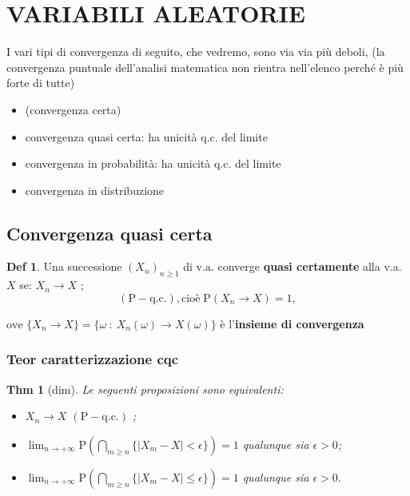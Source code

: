 \documentclass[a4paper,11pt]{article}
\theoremstyle{plain}
\newtheorem{thm}{Thm}[section]
\theoremstyle{definition}
\newtheorem{defn}{Def}[section]
\theoremstyle{remark}
\begin{document}
\newpage

\section {VARIABILI ALEATORIE}

I  vari tipi di convergenza di seguito, che vedremo, sono via via più deboli, (la convergenza puntuale dell'analisi matematica non rientra nell'elenco perché è più forte di tutte)
\begin{itemize}
    \item [1] (convergenza certa)
    \item [2] convergenza quasi certa: ha unicità q.c. del limite
    \item [3] convergenza in probabilità: ha unicità q.c. del limite 
    \item [4] convergenza in distribuzione
\end{itemize}
\subsection{Convergenza quasi certa}
\begin{defn}  
Una successione $(X_{n})_{n\geq 1}$ di $\mathrm{v}.\mathrm{a}$. converge \textbf{quasi certamente} alla v.a. $X$ se: $X_{n}\rightarrow X$ ;
$$\mathrm{ (P-q.c.) },  \mathrm{cioè } \;
\mathrm{P}(X_{n} \rightarrow X)=1,$$

\noindent
$\mathrm{o}\mathrm{v}\mathrm{e}$  $\{X_{n}\rightarrow X\}=\{\omega\ :\ X_{n}(\omega)\rightarrow X(\omega)\}$ è l'\textbf{insieme di convergenza}
\end{defn}

\subsubsection{Teor caratterizzazione cqc}
\begin{thm}[dim] Le seguenti proposizioni sono equivalenti:
\begin{itemize}
\item [i)]$X_{n}\rightarrow X$ $ (\mathrm{P}- \mathrm{q}.\mathrm{c}.)$ ;
\item [ii)] $\displaystyle \lim_{n\rightarrow+\infty}\mathrm{P}(\bigcap_{m\geq n}\{|X_{m}-X|<\epsilon\})=1$ qualunque sia $\epsilon>0$; 
\item [iii)] $\displaystyle \lim_{n\rightarrow+\infty}\mathrm{P}(\bigcap_{m\geq n}\{|X_{m}-X|\leq\epsilon\})=1$ qualunque sia $\epsilon>0.$
\end{itemize}
\end{thm}
\end{document}
